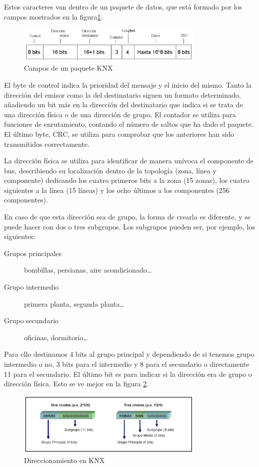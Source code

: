 Estos caracteres van dentro de un paquete de datos, que está formado por los campos mostrados en la figura\ref{fig:campos_paq_knx}.
\begin{figure}
	\centering
		\includegraphics[width=0.80\textwidth]{imagenes/campos_paq_knx.jpg}
	\caption{Campos de un paquete KNX}
	\label{fig:campos_paq_knx}
\end{figure}


El byte de control indica la prioridad del mensaje y el inicio del mismo. Tanto la dirección del emisor como la del destinatario siguen un formato determinado, añadiendo un bit más en la dirección del destinatario que indica si se trata de una dirección física o de una dirección de grupo. El contador se utiliza para funciones de enrutamiento, contando el número de saltos que ha dado el paquete. El último byte, CRC, se utiliza para comprobar que los anteriores han sido transmitidos correctamente.


La dirección física se utiliza para identificar de manera unívoca el componente de bus, describiendo su localización dentro de la topología (zona, línea y componente) dedicando los cuatro primeros bits a la zona (15 zonas), los cuatro siguientes a la línea (15 líneas) y los ocho últimos a los componentes (256 componentes).


En caso de que esta dirección sea de grupo, la forma de crearla es diferente, y se puede hacer con dos o tres subgrupos. Los subgrupos pueden ser, por ejemplo, los siguientes:
\begin{description}
	\item[Grupos principales] bombillas, persianas, aire acondicionado…
	\item[Grupo intermedio] primera planta, segunda planta…
	\item[Grupo secundario] oficinas, dormitorio…
\end{description}


Para ello destinamos 4 bits al grupo principal y dependiendo de si tenemos grupo intermedio o no, 3 bits para el intermedio y 8 para el secundario o directamente 11 para el secundario. El último bit es para indicar si la dirección era de grupo o dirección física. Esto se ve mejor en la figura \ref{fig:Niveles-direccionamiento-grupo-knx}.
\begin{figure}[htbp]
	\centering
		\includegraphics[width=0.80\textwidth]{imagenes/Niveles-direccionamiento-grupo-knx.png}
	\caption{Direccionamiento en KNX}
	\label{fig:Niveles-direccionamiento-grupo-knx}
\end{figure}




